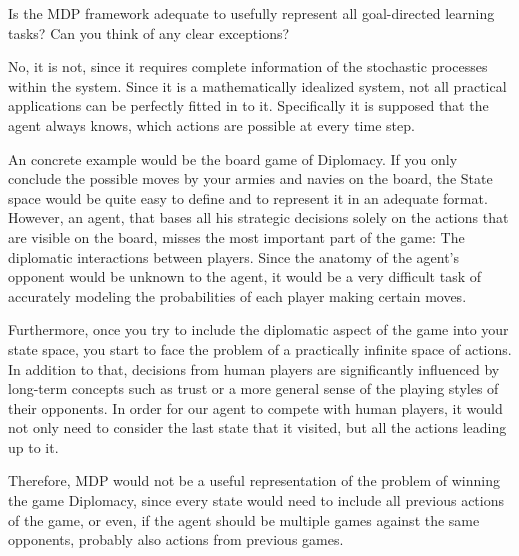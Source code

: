 
\begin{exercise}[Exercise 3.2]

Is the MDP framework adequate to usefully represent all goal-directed learning tasks?
Can you think of any clear exceptions?

\end{exercise}


\begin{solution}

No, it is not, since it requires complete information of the stochastic processes
within the system. Since it is a mathematically idealized system, not all practical
applications can be perfectly fitted in to it. Specifically it is supposed that
the agent always knows, which actions are possible at every time step.

An concrete example would be the board game of Diplomacy.
If you only conclude the possible moves by your armies and navies on the board,
the State space would be quite easy to define and to represent it in an adequate format.
However, an agent, that bases all his strategic decisions solely on the actions that
are visible on the board, misses the most important part of the game: The diplomatic
interactions between players. Since the anatomy of the agent's opponent would be
unknown to the agent, it would be a very difficult task of accurately modeling the
probabilities of each player making certain moves.

Furthermore, once you try to include the diplomatic aspect of the game into
your state space, you start to face the problem of a practically infinite space of actions.
In addition to that, decisions from human players are significantly influenced
by long-term concepts such as trust or a more general sense of the playing styles
of their opponents. In order for our agent to compete with human players, it
would not only need to consider the last state that it visited, but all the actions
leading up to it.

Therefore, MDP would not be a useful representation of the problem of winning the game Diplomacy,
since every state would need to include all previous actions of the game,
or even, if the agent should be multiple games against the same opponents,
probably also actions from previous games.

\end{solution}

